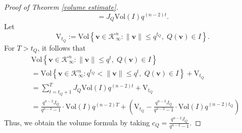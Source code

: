 \documentclass[11pt,a4paper,reqno]{amsart}
\def\vol{\mathrm{Vol}}
\theoremstyle{definition}
\theoremstyle{remark}
\numberwithin{equation}{section}
\begin{document}
\begin{proof}[Proof of Theorem \ref{volume estimate}]
\[=J_{Q}\vol(I) q^{(n-2)t}.
\]
Let 
\[
\mathrm{V}_{t_Q}:= \vol\left\{\mathbf v\in \mathcal K_\infty^n: \|\mathbf v\|\le q^{t_Q},\; Q(\mathbf v)\in I\right\}.
\]
For $T> t_Q$, it follows that
\[\begin{split}
&\vol\left\{\mathbf v\in \mathcal K_\infty^n: \|\mathbf v\|\le q^{t} ,\; Q(\mathbf v)\in I\right\}\\
&=\vol\left\{\mathbf v\in \mathcal K_\infty^n: q^{t_Q}<\|\mathbf v\|\le q^{t} ,\; Q(\mathbf v)\in I\right\}+\mathrm{V}_{t_Q}\\
&=\sum_{t=t_Q+1}^T J_Q\vol(I)q^{(n-2)t}+\mathrm{V}_{t_Q}\\
&=\frac {q^{n-2}J_Q}{q^{n-2}-1}\cdot \vol(I)q^{(n-2)T}+\left(\mathrm{V}_{t_Q}-\frac {q^{n-2}J_Q}{q^{n-2}-1}\cdot \vol(I)q^{(n-2)t_Q}\right)
\end{split}\]
Thus, we obtain the volume formula by taking $c_Q=\frac{q^{n-2}J_Q}{q^{n-2}-1}$. 
\end{proof}
\end{document}
